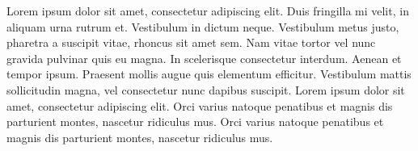 \documentclass[../report.tex]{subfiles}
\begin{document}
Lorem ipsum dolor sit amet, consectetur adipiscing elit. Duis fringilla mi velit, in aliquam urna rutrum et. Vestibulum in dictum neque. Vestibulum metus justo, pharetra a suscipit vitae, rhoncus sit amet sem. Nam vitae tortor vel nunc gravida pulvinar quis eu magna. In scelerisque consectetur interdum. Aenean et tempor ipsum. Praesent mollis augue quis elementum efficitur. Vestibulum mattis sollicitudin magna, vel consectetur nunc dapibus suscipit. Lorem ipsum dolor sit amet, consectetur adipiscing elit. Orci varius natoque penatibus et magnis dis parturient montes, nascetur ridiculus mus. Orci varius natoque penatibus et magnis dis parturient montes, nascetur ridiculus mus.
\end{document}
